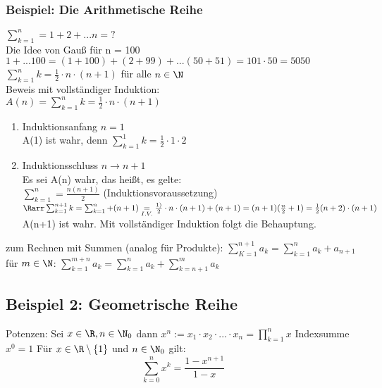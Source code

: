 \subsubsection*{Beispiel: Die Arithmetische Reihe}
$\sum_{k = 1}^{n} = 1 + 2 + ... n = ?$\\
Die Idee von Gauß für n = 100\\
$1 + ... 100 = (1 + 100) + (2 + 99) + ... (50 + 51) = 101 \cdot 50 = 5050$\\
\Satz
$\sum_{k=1}^{n} k = \frac{1}{2} \cdot n \cdot (n+1)$ für alle $n \in \N$\\
Beweis mit vollständiger Induktion:\\
$A(n) = \sum_{k=1}^{n} k = \frac{1}{2} \cdot n \cdot (n + 1)$
\begin{enumerate}
\item Induktionsanfang $n = 1$\\
A(1) ist wahr, denn $\sum_{k=1}^{1} k = \frac{1}{2} \cdot 1 \cdot 2$ \ok
\item Induktionsschluss $n \to n + 1$\\
Es sei A(n) wahr, das heißt, es gelte:\\
$\sum_{k = 1}^{n} = \frac{n (n+1)}{2}$ (Induktionsvoraussetzung)\\
$\Rarr \sum_{k = 1}^{n + 1} k = \sum_{k = 1}^{n} + (n + 1) \underset{I.V.}{=} \frac{1)}{2} \cdot n \cdot (n+1) + (n+1) = (n+1)(\frac{n}{2} + 1) = \frac{1}{2} (n+2) \cdot (n+1)$
\Rarr A(n+1) ist wahr. Mit vollständiger Induktion folgt die Behauptung.
\end{enumerate}
\bem zum Rechnen mit Summen (analog für Produkte):
$\sum_{K = 1}^{n + 1} a_k = \sum_{k = 1}^{n} a_k + a_{n+1}$\\
für $m \in \N$: $\sum_{k=1}^{m+n} a_k = \sum_{k = 1}^{n} a_k + \sum_{k = n + 1}^{m} a_k$
\subsection*{Beispiel 2: Geometrische Reihe}
Potenzen: Sei $x\in \R, n \in \N_0$ dann $x^n := x_1 \cdot x_2 \cdot ... \cdot x_n = \prod_{k=1}^{n} x$
Indexsumme $x^0 = 1$
Für $x \in \R\setminus \{1\}$ und $n \in \N_0$ gilt:
$$\sum_{k = 0}^{n} x^k = \frac{1 - x^{n+1}}{1 - x}$$
